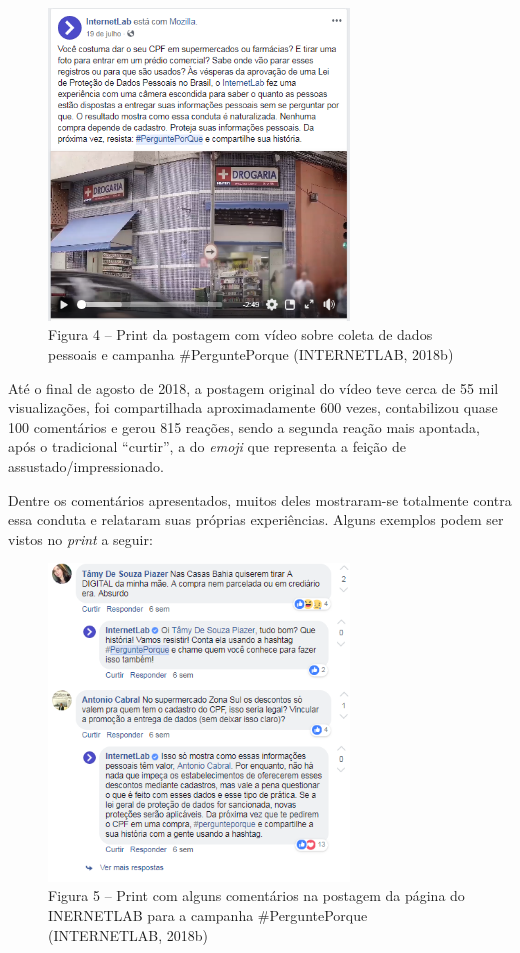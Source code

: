\begin{figure}[!ht]
\centering
  \includegraphics[width=80mm]{./imgs/grafico5.png}
\caption{Figura 4 -- Print da postagem com vídeo sobre coleta de dados pessoais e campanha \#PerguntePorque (INTERNETLAB, 2018b)}
 \end{figure}

Até o final de agosto de 2018, a postagem original do vídeo teve cerca
de 55 mil visualizações, foi compartilhada aproximadamente 600 vezes,
contabilizou quase 100 comentários e gerou 815 reações, sendo a segunda
reação mais apontada, após o tradicional ``curtir'', a do \emph{emoji}
que representa a feição de assustado/impressionado.

Dentre os comentários apresentados, muitos deles mostraram-se totalmente
contra essa conduta e relataram suas próprias experiências. Alguns
exemplos podem ser vistos no \emph{print} a seguir:

\begin{figure}[!ht]
\centering
  \includegraphics[width=80mm]{./imgs/grafico6.png}
\caption{Figura 5 -- Print com alguns comentários na postagem da página do INERNETLAB para a campanha \#PerguntePorque (INTERNETLAB, 2018b)}
 \end{figure}

